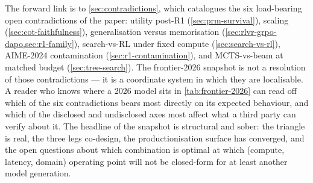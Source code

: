The forward link is to \cref{sec:contradictions}, which catalogues the
six load-bearing open contradictions of the paper:
 utility post-R1 (\cref{sec:prm-survival}), 
scaling (\cref{sec:cot-faithfulness}),  generalisation versus
memorisation
(\cref{sec:rlvr-grpo-dapo,sec:r1-family}), search-vs-RL under fixed
compute (\cref{sec:search-vs-rl}), AIME-2024 contamination
(\cref{sec:r1-contamination}), and MCTS-vs-beam at matched budget
(\cref{sec:tree-search}). The frontier-2026 snapshot is not a
resolution of those contradictions --- it is a coordinate system in
which they are localisable. A reader who knows where a 2026 model sits
in \cref{tab:frontier-2026} can read off which of the six
contradictions bears most directly on its expected behaviour, and which
of the disclosed and undisclosed axes most affect what a third party
can verify about it. The headline of the snapshot is structural and
sober: the triangle is real, the three legs co-design, the
productionisation surface has converged, and the open questions about
which combination is optimal at which (compute, latency, domain)
operating point will not be closed-form for at least another model
generation.
